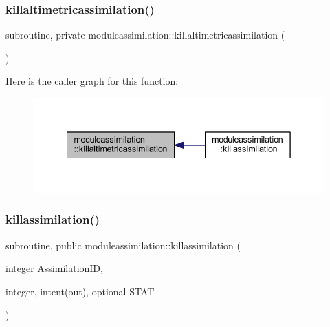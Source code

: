 \subsubsection{\texorpdfstring{killaltimetricassimilation()}{killaltimetricassimilation()}}
{\footnotesize\ttfamily subroutine, private moduleassimilation\+::killaltimetricassimilation (\begin{DoxyParamCaption}{ }\end{DoxyParamCaption})\hspace{0.3cm}{\ttfamily [private]}}

Here is the caller graph for this function\+:\nopagebreak
\begin{figure}[H]
\begin{center}
\leavevmode
\includegraphics[width=342pt]{namespacemoduleassimilation_a457aa90cd01b96e0e4a625d41ea9ba78_icgraph}
\end{center}
\end{figure}
\mbox{\label{namespacemoduleassimilation_a3e8d98d577185433d513756aadd846f8}} 
\subsubsection{\texorpdfstring{killassimilation()}{killassimilation()}}
{\footnotesize\ttfamily subroutine, public moduleassimilation\+::killassimilation (\begin{DoxyParamCaption}\item[{integer}]{Assimilation\+ID,  }\item[{integer, intent(out), optional}]{S\+T\+AT }\end{DoxyParamCaption})}

